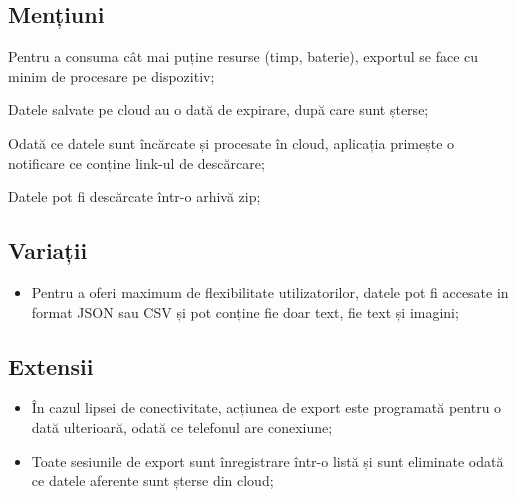 \subsection{Mențiuni}\label{menux21biuni-3}

Pentru a consuma cât mai puține resurse (timp, baterie), exportul se face cu minim de procesare pe dispozitiv;

Datele salvate pe cloud au o dată de expirare, după care sunt șterse;

Odată ce datele sunt încărcate și procesate în cloud, aplicația primește o notificare ce conține link-ul de descărcare;

Datele pot fi descărcate într-o arhivă zip;

\subsection{Variații}\label{variaux21bii-2}

\begin{itemize}
\item
  Pentru a oferi maximum de flexibilitate utilizatorilor, datele pot fi accesate in format JSON sau CSV și pot conține fie doar text, fie text și imagini;
\end{itemize}

\subsection{Extensii}\label{extensii-2}

\begin{itemize}
\item
  În cazul lipsei de conectivitate, acțiunea de export este programată pentru o dată ulterioară, odată ce telefonul are conexiune;
\item
  Toate sesiunile de export sunt înregistrare într-o listă și sunt eliminate odată ce datele aferente sunt șterse din cloud;
\end{itemize}
